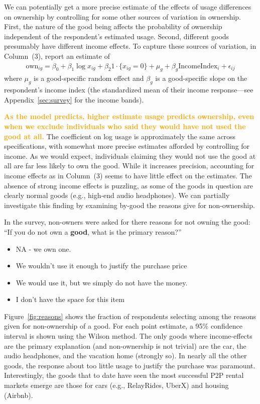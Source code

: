 \documentclass[11pt]{article}
\newcommand{\important}[1]{\textcolor{orange}{\textbf{#1}}}
\newcommand{\important}[1]{#1}
\begin{document}
We can potentially get a more precise estimate of the effects of usage differences on ownership by controlling for some other sources of variation in ownership. 
First, the nature of the good being affects the probability of ownership independent of the respondent's estimated usage. 
Second, different goods presumably have different income effects.  
To capture these sources of variation, in Column~(3), report an estimate of 
\begin{align} \label{eq:usage_and_income}
\mbox{own}_{ig} = \beta_0 + \beta_1 \log x_{ig} + \beta_2 1\cdot\{x_{ig} = 0\} + \mu_g + \beta_g \mbox{IncomeIndex}_i + \epsilon_{ij}  
\end{align} 
where $\mu_g$ is a good-specific random effect and $\beta_g$ is a good-specific slope on the respondent's income index (the standardized mean of their income response---see Appendix~\ref{sec:survey} for the income bands). 



\important{As the model predicts, higher estimate usage predicts ownership, even when we exclude individuals who said they would have not used the good at all.} 
The coefficient on log usage is approximately the same across specifications, with somewhat more precise estimates afforded by controlling for income. 
As we would expect, individuals claiming they would not use the good at all are far less likely to own the good. 
While it increases precision, accounting for income effects as in Column~(3) seems to have little effect on the estimates. 
The absence of strong income effects is puzzling, as some of the goods in question are clearly normal goods (e.g., high-end audio headphones). 
We can partially investigate this finding by examining by-good the reasons give for non-ownership. 

In the survey, non-owners were asked for there reasons for not owning the good:
``If you do not own a {\bf good}, what is the primary reason?''
\begin{itemize} 
\item NA - we own one.
\item We wouldn't use it enough to justify the purchase price
\item We would use it, but we simply do not have the money.
\item I don't have the space for this item
\end{itemize} 
Figure~\ref{fig:reasons} shows the fraction of respondents selecting among the reasons given for non-ownership of a good. 
For each point estimate, a 95\% confidence interval is shown using the Wilson method. 
The only goods where income-effects are the primary explanation (and non-ownership is not trivial) are the car, the audio headphones, and the vacation home (strongly so). 
In nearly all the other goods, the response about too little usage to justify the purchase was paramount. 
Interestingly, the goods that to date have seen the most successful P2P rental markets emerge are those for cars (e.g., RelayRides, UberX) and housing (Airbnb). 
\end{document}
